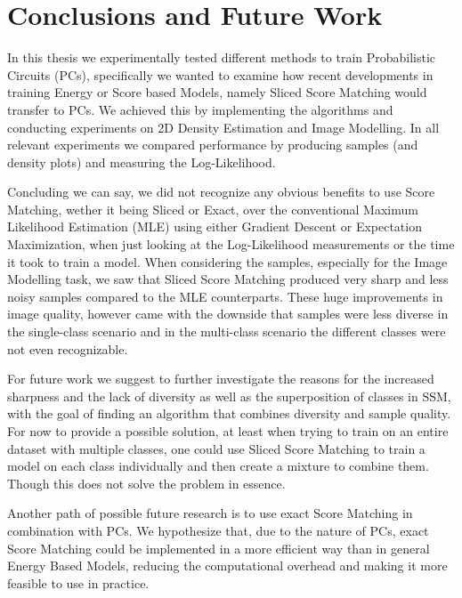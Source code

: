 \chapter{Conclusions and Future Work}
\label{cha:conclusions}

In this thesis we experimentally tested different methods to train Probabilistic Circuits (PCs), specifically
we wanted to examine how recent developments in training Energy or Score based Models, namely 
Sliced Score Matching would transfer to PCs. 
We achieved this by implementing the algorithms and conducting experiments on 2D Density Estimation
and Image Modelling. In all relevant experiments we compared performance by producing samples 
(and density plots) and measuring the Log-Likelihood.

Concluding we can say, we did not recognize any obvious benefits to use Score Matching, wether it being Sliced 
or Exact, over the conventional Maximum Likelihood Estimation (MLE) using either Gradient Descent 
or Expectation Maximization, when just looking at the Log-Likelihood measurements or the time it 
took to train a model. 
When considering the samples, especially for the Image Modelling task, we saw that Sliced Score Matching
produced very sharp and less noisy samples compared to the MLE counterparts.
These huge improvements in image quality, however came with the downside that 
samples were less diverse in the single-class scenario and in the multi-class scenario
the different classes were not even recognizable.

For future work we suggest to further investigate the reasons for the increased sharpness and the 
lack of diversity as well as the superposition of classes in SSM, with the goal of finding 
an algorithm that combines diversity and sample quality. 
For now to provide a possible solution, at least when trying to train on an entire dataset with 
multiple classes, one could use Sliced Score Matching to train a model on each class individually and 
then create a mixture to combine them. Though this does not solve the problem in essence.

Another path of possible future research is to use exact Score Matching in combination with
PCs. We hypothesize that, due to the nature of PCs, exact Score Matching 
could be implemented in a more efficient way than in general Energy Based Models, reducing 
the computational overhead and making it more feasible to use in practice.